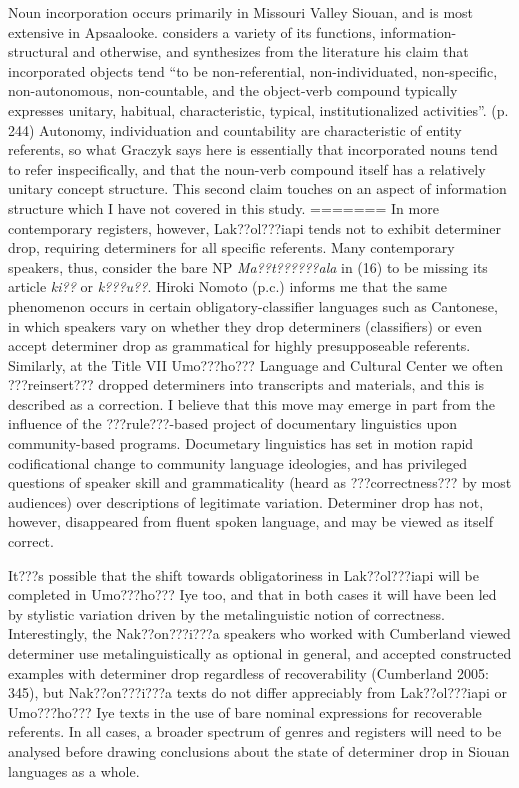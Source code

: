 \documentclass[output=paper]{LSP/langsci}
\begin{document}
Noun incorporation occurs primarily in Missouri Valley Siouan, and is most extensive in Apsaalooke. \citet{Graczyk1991} considers a variety of its functions, information-structural and otherwise, and synthesizes from the literature his claim that incorporated objects tend “to be non-referential, non-individuated, non-specific, non-autonomous, non-countable, and the object-verb compound typically expresses unitary, habitual, characteristic, typical, institutionalized activities”. (p. 244) Autonomy, individuation and countability are characteristic of entity referents, so what Graczyk says here is essentially that incorporated nouns tend to refer inspecifically, and that the noun-verb compound itself has a relatively unitary concept structure. This second claim touches on an aspect of information structure which I have not covered in this study.
=======
In more contemporary registers, however, Lak??ol???iapi tends not to exhibit determiner drop, requiring determiners for all specific referents. Many contemporary speakers, thus, consider the bare NP \emph{Ma??t??????ala} in (16) to be missing its article \emph{ki??} or \emph{k???u??}. Hiroki Nomoto (p.c.) informs me that the same phenomenon occurs in certain obligatory-classifier languages such as Cantonese, in which speakers vary on whether they drop determiners (classifiers) or even accept determiner drop as grammatical for highly presupposeable referents. Similarly, at the Title VII Umo???ho??? Language and Cultural Center we often ???reinsert??? dropped determiners into transcripts and materials, and this is described as a correction. I believe that this move may emerge in part from the influence of the ???rule???-based project of documentary linguistics upon community-based programs. Documetary linguistics has set in motion rapid codificational change to community language ideologies, and has privileged questions of speaker skill and grammaticality (heard as ???correctness??? by most audiences) over descriptions of legitimate variation. Determiner drop has not, however, disappeared from fluent spoken language, and may be viewed as itself correct.

	It???s possible that the shift towards obligatoriness in Lak??ol???iapi will be completed in Umo???ho??? Iye too, and that in both cases it will have been led by stylistic variation driven by the metalinguistic notion of correctness. Interestingly, the Nak??on???i???a speakers who worked with Cumberland viewed determiner use metalinguistically as optional in general, and accepted constructed examples with determiner drop regardless of recoverability (Cumberland 2005: 345), but Nak??on???i???a texts do not differ appreciably from Lak??ol???iapi or Umo???ho??? Iye texts in the use of bare nominal expressions for recoverable referents. In all cases, a broader spectrum of genres and registers will need to be analysed before drawing conclusions about the state of determiner drop in Siouan languages as a whole.
\end{document}
